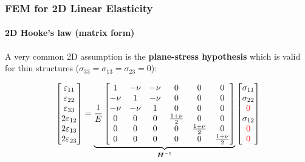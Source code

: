 \documentclass[10pt,xcolor=pdftex,dvipsnames,table]{beamer}
\begin{document}
\begin{frame}
	\frametitle{ FEM for 2D Linear Elasticity }
	\framesubtitle{ 2D Hooke's law (matrix form) }
	
	A very common 2D assumption is the \textbf{plane-stress hypothesis} which is valid for thin structures  ($\sigma_{33}=\sigma_{13}=\sigma_{23}=0$):
	
	\begin{equation*}	
		\begin{bmatrix}
			\varepsilon_{11} \\
			\varepsilon_{22} \\
			\varepsilon_{33} \\
			2\varepsilon_{12} \\
			2\varepsilon_{13} \\
			2\varepsilon_{23} \\	
		\end{bmatrix}
	= \underbrace{\frac{1}{E}
	\begin{bmatrix}
		1 & -\nu & -\nu & 0 & 0 & 0 \\
		-\nu & 1 &  -\nu & 0 & 0 & 0 \\
		-\nu & -\nu & 1 &  0 & 0 & 0 \\
		0 &0 & 0 & \frac{1+\nu}{2} & 0 & 0 \\
		0 &0 & 0 & 0 &\frac{1+\nu}{2}  & 0 \\
		0 &0 & 0  & 0 & 0 & \frac{1+\nu}{2} \\
	\end{bmatrix}}_{\boldsymbol{H}^{-1}}		
	\begin{bmatrix}
		\sigma_{11} \\
		\sigma_{22} \\
		\color{red}0 \\
		\sigma_{12} \\
		\color{red}0 \\
		\color{red}0 \\	
	\end{bmatrix}				
	\end{equation*}	

	

\end{frame}
\end{document}
